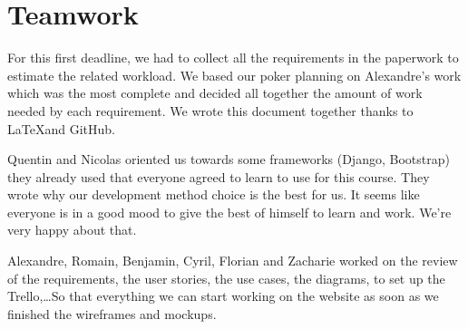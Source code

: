 \section{Teamwork}

For this first deadline, we had to collect all the requirements in the
paperwork to estimate the related workload. We based our poker planning
on Alexandre's work which was the most complete and decided all together the
amount of work needed by each requirement. We wrote this document
together thanks to \LaTeX  and GitHub.\newline

Quentin and Nicolas oriented us towards some frameworks (Django,
Bootstrap) they already used that everyone agreed to learn to use for
this course. They wrote why our development method choice is the best
for us. It seems like everyone is in a good mood to give the best of
himself to learn and work. We're very happy about that. \newline

Alexandre, Romain, Benjamin, Cyril, Florian and Zacharie worked on the
review of the requirements, the user stories, the use cases, the
diagrams, to set up the Trello,\ldots So that everything we can start
working on the website as soon as we finished the wireframes and
mockups. \newline
